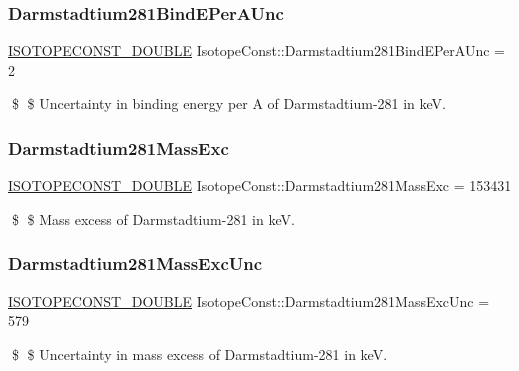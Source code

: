 \subsubsection{\texorpdfstring{Darmstadtium281\+Bind\+E\+Per\+A\+Unc}{Darmstadtium281BindEPerAUnc}}
{\footnotesize\ttfamily \mbox{\hyperlink{group___isotope_const-_macros_ga8f45a7272ce02c0b4c65c44636ed719a}{I\+S\+O\+T\+O\+P\+E\+C\+O\+N\+S\+T\+\_\+\+D\+O\+U\+B\+LE}} Isotope\+Const\+::\+Darmstadtium281\+Bind\+E\+Per\+A\+Unc = 2}

\$ \$ Uncertainty in binding energy per A of Darmstadtium-\/281 in keV. \mbox{\label{group___isotope_const-_darmstadtium-_ds281_ga17f04be43be0357e8ded9a8251492f00}} 
\subsubsection{\texorpdfstring{Darmstadtium281\+Mass\+Exc}{Darmstadtium281MassExc}}
{\footnotesize\ttfamily \mbox{\hyperlink{group___isotope_const-_macros_ga8f45a7272ce02c0b4c65c44636ed719a}{I\+S\+O\+T\+O\+P\+E\+C\+O\+N\+S\+T\+\_\+\+D\+O\+U\+B\+LE}} Isotope\+Const\+::\+Darmstadtium281\+Mass\+Exc = 153431}

\$ \$ Mass excess of Darmstadtium-\/281 in keV. \mbox{\label{group___isotope_const-_darmstadtium-_ds281_ga97d803d1eacd3ee126b8f5332870b6f8}} 
\subsubsection{\texorpdfstring{Darmstadtium281\+Mass\+Exc\+Unc}{Darmstadtium281MassExcUnc}}
{\footnotesize\ttfamily \mbox{\hyperlink{group___isotope_const-_macros_ga8f45a7272ce02c0b4c65c44636ed719a}{I\+S\+O\+T\+O\+P\+E\+C\+O\+N\+S\+T\+\_\+\+D\+O\+U\+B\+LE}} Isotope\+Const\+::\+Darmstadtium281\+Mass\+Exc\+Unc = 579}

\$ \$ Uncertainty in mass excess of Darmstadtium-\/281 in keV. \mbox{\label{group___isotope_const-_darmstadtium-_ds281_ga67aaf1f769e62092f8a1bbbff1c653de}} 
